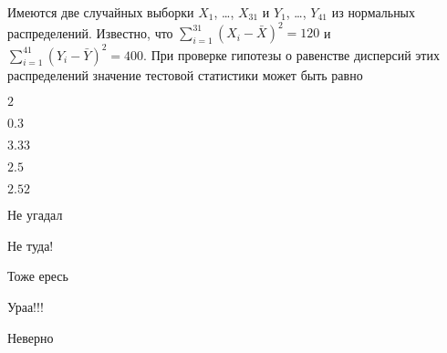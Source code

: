 
\begin{question}
Имеются две случайных выборки \(X_1\), \ldots, \(X_{31}\) и \(Y_1\),
\ldots, \(Y_{41}\) из нормальных распределений. Известно, что
\(\sum_{i=1}^{31}(X_i - \bar X)^2 = 120\) и
\(\sum_{i=1}^{41}(Y_i - \bar Y)^2 = 400\). При проверке гипотезы о
равенстве дисперсий этих распределений значение тестовой статистики
может быть равно
\begin{answerlist}
  \item \(2\)
  \item \(0.3\)
  \item \(3.33\)
  \item \(2.5\)
  \item \(2.52\)
\end{answerlist}
\end{question}

\begin{solution}
\begin{answerlist}
  \item Не угадал
  \item Не туда!
  \item Тоже ересь
  \item Ураа!!!
  \item Неверно
\end{answerlist}
\end{solution}

